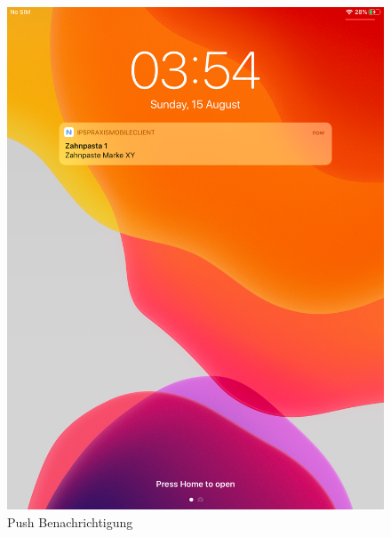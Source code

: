 \begin{figure}[h]
\begin{minipage}[b]{0.4\textwidth}
        \includegraphics[width=\textwidth]{graphics/screenshots/mobileclient/screenshot-push}
        \caption{Push Benachrichtigung}
    \end{minipage}
    \label{fig:MobileClient-Screens3}
\end{figure}

\clearpage

